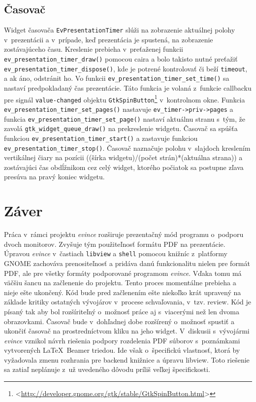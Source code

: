 \documentclass[12pt,oneside,final]{fithesis2}
\begin{document}
\section{Časovač}
Widget časovača \texttt{EvPresentationTimer} slúži na zobrazenie aktuálnej polohy v~prezentácii a v~prípade, keď prezentácia je spustená, na zobrazenie zostávajúceho času. Kreslenie prebieha v~preťaženej funkcii  \texttt{ev\_\-presentation\_\-timer\_\-draw()} pomocou caira a bolo takisto nutné preťažiť \texttt{ev\_\-presentation\_\-timer\_\-dispose()}, kde je potrené kontrolovať či beží \texttt{timeout}, a ak áno, odstránit ho. Vo funkcii \texttt{ev\_\-presentation\_\-timer\_\-set\_\-time()} sa nastaví predpokladaný čas prezentácie. Táto funkcia je volaná z~funkcie callbacku pre signál \texttt{value-changed} objektu \texttt{GtkSpinButton}\footnote{<\url{http://developer.gnome.org/gtk/stable/GtkSpinButton.html}>} v~kontrolnom okne. Funkcia \texttt{ev\_\-presentation\_\-timer\_\-set\_\-pages()} nastavuje \texttt{ev\_\-timer->priv->pages} a funkcia \texttt{ev\_\-presentation\_\-timer\_\-set\_\-page()} nastaví aktuálnu stranu s~tým, že zavolá \texttt{gtk\_\-widget\_\-queue\_\-draw()} na prekreslenie widgetu. Časovač sa spúšťa funkciou \texttt{ev\_\-presentation\_\-timer\_\-start()} a zastavuje funkciou \texttt{ev\_\-presentation\_\-timer\_\-stop()}. Časovač naznačuje polohu v~slajdoch kreslením vertikálnej čiary na pozícii ((šírka widgetu)/(počet strán)*(aktuálna strana)) a zostávajúci čas obdĺžnikom cez celý widget, ktorého počiatok sa postupne zľava presúva na pravý koniec widgetu.

\chapter{Záver}
Práca v~rámci projektu \emph{evince} rozširuje prezentačný mód programu o~podporu dvoch monitorov. Zvyšuje tým použiteľnosť formátu PDF na prezentácie. Úpravou \emph{evince} v~častiach \texttt{libview} a \texttt{shell} pomocou knižníc z~platformy GNOME zachováva prenositeľnosť a pridáva danú funkcionalitu nielen pre formát PDF, ale pre všetky formáty podporované programom \emph{evince}. Vďaka tomu má väčšiu šancu na začlenenie do projektu. Tento proces momentálne prebieha a nieje ešte ukončený. Kód bude pred začlenením ešte niekoľko krát upravený na základe kritiky ostatných vývojárov v~procese schvaľovania, v~tzv. review. Kód je písaný tak aby bol rozšíriteľný o~možnosť práce aj s~viacerými než len dvoma obrazovkami. Časovač bude v~dohľadnej dobe rozšírený o~možnosť spustiť a ukončiť časovač na prostredníctvom kliku na jeho widget. V~diskusii s~vývojármi \emph{evince} vznikol návrh riešenia podpory rozdelenia PDF súborov s~poznámkami vytvorených \LaTeX~Beamer triedou. Ide však o~špecifickú vlastnosť, ktorá by vyžadovala zmenu rozhrania pre backend knižnice a úpravu libview. Toto riešenie sa zatiaľ neplánuje z~už uvedeného dôvodu príliš veľkej špecifickosti.
\end{document}
